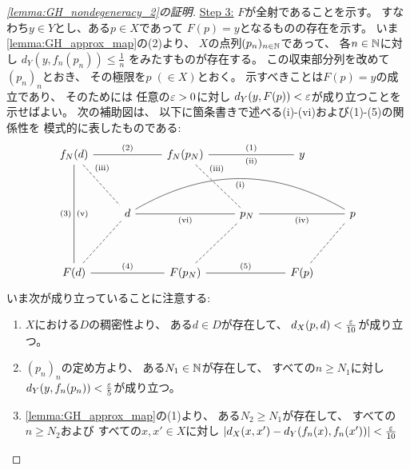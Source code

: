 \documentclass[report, notitlepage]{jlreq}
\begin{document}
\begin{proof}[\cref{lemma:GH_nondegeneracy_2}の証明]
    \uline{Step 3:} \quad
    $F$が全射であることを示す。
    すなわち$y \in Y$とし、ある$p \in X$であって
    $F(p) = y$となるものの存在を示す。
    いま\cref{lemma:GH_approx_map}の(2)より、
    $X$の点列$(p_n)_{n \in \mathbb{N}}$であって、
    各$n \in \mathbb{N}$に対し
    $d_Y(y, f_n(p_n)) \le \frac{1}{n}$
    をみたすものが存在する。
    この収束部分列を改めて$(p_n)_n$とおき、
    その極限を$p \; (\in X)$とおく。
    示すべきことは$F(p) = y$の成立であり、
    そのためには
    任意の$\varepsilon > 0$に対し
    $d_Y(y, F(p)) < \varepsilon$が成り立つことを示せばよい。
    次の補助図は、
    以下に箇条書きで述べる(i)-(vi)および(1)-(5)の関係性を
    模式的に表したものである:
    \begin{equation}
        \begin{tikzcd}[every arrow/.append style={no head,no tail},row sep=huge]
            f_N(d)
                \ar{rr}{(2)}
                \ar{dd}{\text{(v)}}[swap]{(3)}
                \ar[dashed]{rd}[near start]{\text{(iii)}}
                &&f_N(p_N)
                    \ar{rr}{(1)}[swap]{\text{(ii)}}
                    \ar[dashed]{rd}[near start]{\text{(iii)}}
                &&y
                \\
            &d
                \ar{rr}[swap]{\text{(vi)}}
                \ar[bend left]{rrrr}[swap]{\text{(i)}}
                &&p_N
                    \ar{rr}[swap]{\text{(iv)}}
                &&p
                \\
            F(d)
                \ar{rr}{(4)}
                \ar[dashed]{ru}
                &&F(p_N)
                    \ar{rr}{(5)}
                    \ar[dashed]{ru}
                &&F(p)
                    \ar[dashed]{ru}
        \end{tikzcd}
    \end{equation}
    いま次が成り立っていることに注意する:
    \begin{enumerate}[label=(\roman*)]
        \item $X$における$D$の稠密性より、
            ある$d \in D$が存在して、
            $d_X(p, d) < \frac{\varepsilon}{10}$が成り立つ。
        \item $(p_n)_n$の定め方より、
            ある$N_1 \in \mathbb{N}$が存在して、
            すべての$n \ge N_1$に対し
            $d_Y(y, f_n(p_n)) < \frac{\varepsilon}{5}$が成り立つ。
        \item \cref{lemma:GH_approx_map}の(1)より、
            ある$N_2 \ge N_1$が存在して、
            すべての$n \ge N_2$および
            すべての$x, x' \in X$に対し
            $|d_X(x, x') - d_Y(f_n(x), f_n(x'))| < \frac{\varepsilon}{10}$

\end{enumerate}
\end{proof}
\end{document}
